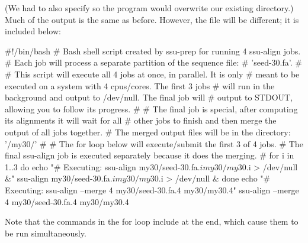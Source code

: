 
(We had to also specify  so the program would overwrite our
existing  directory.) Much of the output is the same as
before. However, the  file will be different;
it is included below:

\begin{sreoutput}
#!/bin/bash
# Bash shell script created by ssu-prep for running 4 ssu-align jobs.
# Each job will process a separate partition of the sequence file:
# 'seed-30.fa'.
#
# This script will execute all 4 jobs at once, in parallel. It is only
# meant to be executed on a system with 4 cpus/cores. The first 3 jobs
# will run in the background and output to /dev/null. The final job will
# output to STDOUT, allowing you to follow its progress.
#
# The final job is special, after computing its alignments it will wait for all
# other jobs to finish and then merge the output of all jobs together.
# The merged output files will be in the directory: '/my30/'
#
# The for loop below will execute/submit the first 3 of 4 jobs.
# The final ssu-align job is executed separately because it does the merging.
#
for i in {1..3}
do
	echo "# Executing: ssu-align my30/seed-30.fa.$i my30/my30.$i > /dev/null &"
	ssu-align my30/seed-30.fa.$i my30/my30.$i > /dev/null &
done
echo "# Executing: ssu-align --merge 4 my30/seed-30.fa.4 my30/my30.4"
ssu-align --merge 4 my30/seed-30.fa.4 my30/my30.4
\end{sreoutput}

Note that the  commands in the for loop include
\prog{\&} at the end, which cause them to be run simultaneously.










